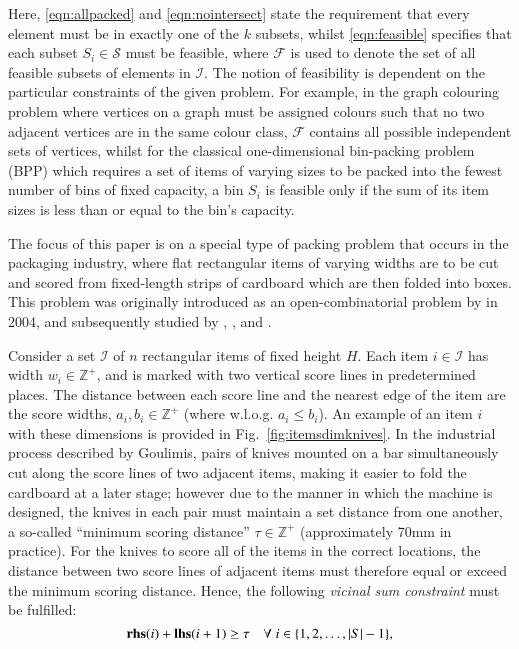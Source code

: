 \documentclass[authoryear]{elsarticle}
\begin{document}
\noindent Here, \eqref{eqn:allpacked} and \eqref{eqn:nointersect} state the requirement that every element must be in exactly one of the $k$ subsets, whilst \eqref{eqn:feasible} specifies that each subset $S_i \in \mathcal{S}$ must be feasible, where $\mathcal{F}$ is used to denote the set of all feasible subsets of elements in $\mathcal{I}$. The notion of feasibility is dependent on the particular constraints of the given problem. For example, in the graph colouring problem where vertices on a graph must be assigned colours such that no two adjacent vertices are in the same colour class, $\mathcal{F}$ contains all possible independent sets of vertices, whilst for the classical one-dimensional bin-packing problem (BPP) which requires a set of items of varying sizes to be packed into the fewest number of bins of fixed capacity, a bin $S_i$ is feasible only if the sum of its item sizes is less than or equal to the bin's capacity.

The focus of this paper is on a special type of packing problem that occurs in the packaging industry, where flat rectangular items of varying widths are to be cut and scored from fixed-length strips of cardboard which are then folded into boxes. This problem was originally introduced as an open-combinatorial problem by \citeauthor{goulimis2004} in 2004, and subsequently studied by \citet{lewis2011}, \citet{becker2015}, and \citet{hawa2018}.

Consider a set $\mathcal{I}$ of $n$ rectangular items of fixed height $H$. Each item $i \in \mathcal{I}$ has width $w_i \in \mathbb{Z}^+$, and is marked with two vertical score lines in predetermined places. The distance between each score line and the nearest edge of the item are the score widths, $a_i, b_i \in \mathbb{Z}^+$ (where w.l.o.g. $a_i \leq b_i$). An example of an item $i$ with these dimensions is provided in Fig.~\ref{fig:itemsdimknives}. In the industrial process described by Goulimis, pairs of knives mounted on a bar simultaneously cut along the score lines of two adjacent items, making it easier to fold the cardboard at a later stage; however due to the manner in which the machine is designed, the knives in each pair must maintain a set distance from one another, a so-called ``minimum scoring distance'' $\tau \in \mathbb{Z}^+$ (approximately 70mm in practice). For the knives to score all of the items in the correct locations, the distance between two score lines of adjacent items must therefore equal or exceed the minimum scoring distance. Hence, the following \emph{vicinal sum constraint} must be fulfilled:
\begin{equation}
	\textbf{rhs}(i) + \textbf{lhs}(i+1) \geq \tau \quad \forall \hspace{1mm} i \in \{1,2,\dotsc,|S|- 1\},
	\label{eqn:vsc}
\end{equation}
\end{document}
